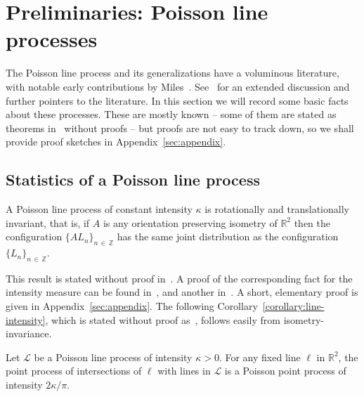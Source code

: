 \documentclass[AHL, Unicode, longabstracts, published]{cedram}
\newcommand{\zz}[1]{\mathbb #1}
\begin{document}
\section{Preliminaries: Poisson line processes} \label{sec:preliminaries}
The Poisson line process and its generalizations have a voluminous literature, with notable early contributions by Miles~\cite{miles:pnas1,miles:pnas2}. See~\cite{kendall-et-al} for an extended discussion and further pointers to the literature. In this section we will record some basic facts about these processes. These are mostly known -- some of them are stated as theorems in~\cite{miles:pnas1} without proofs -- but proofs are not easy to track down, so we shall provide proof sketches in Appendix~\ref{sec:appendix}.



\subsection{Statistics of a Poisson line process}\label{ssec:plp}

\begin{lemm}\label{lemma:translation-invariance}
A Poisson line process of constant intensity $\kappa$ is rotationally and translationally invariant, that is, if $A$ is any orientation preserving isometry of $\zz{R}^{2}$ then the configuration $\{AL_{n} \}_{n\,\in\,\zz{Z}}$ has the same joint distribution as the configuration $\{L_{n} \}_{n\,\in\,\zz{Z}}$.
\end{lemm}

\begin{rema}\label{remark:ti}
This result is stated without proof in~\cite{miles:pnas1}. A proof of the corresponding fact for the intensity measure can be found in~\cite{santalo}, and another in~\cite[Chapter~8]{kendall-et-al}. A short, elementary proof is given in Appendix~\ref{sec:appendix}. The following Corollary~\ref{corollary:line-intensity}, which is stated without proof as~\cite[Theorem~2]{miles:pnas1}, follows easily from isometry-invariance.
\end{rema}

\begin{coro}\label{corollary:line-intensity}
Let $\mathcal{L}$ be a Poisson line process of intensity $\kappa>0$. For any fixed line $\ell$ in $\mathbb{R}^{2}$, the point process of intersections of $\ell$ with lines in $\mathcal{L}$ is a Poisson point process of intensity $2\kappa /\pi$.
\end{coro}
\end{document}

